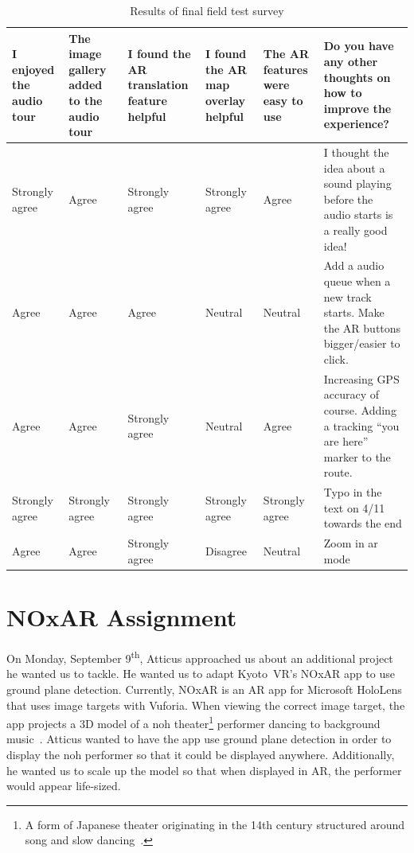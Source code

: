 \documentclass[a4paper, 10pt, american, titlepage]{article}
\begin{document}
\begin{table}[h]
\begin{singlespace}
\renewcommand{\arraystretch}{2.0} %
\footnotesize %
\begin{tabulary}{\textwidth}{ L | L | L | L | L | L }
	I enjoyed the audio tour & The image gallery added to the audio tour & I
	found the AR translation feature helpful & I found the AR map overlay
	helpful & The AR features were easy to use & Do you have any other thoughts
	on how to improve the experience? \\
	\hline

	Strongly agree & Agree & Strongly agree & Strongly agree & Agree & I thought
	the idea about a sound playing before the audio starts is a really good
	idea! \\

	Agree & Agree & Agree & Neutral & Neutral & Add a audio queue when a new
	track starts. Make the AR buttons bigger/easier to click. \\

	Agree & Agree & Strongly agree & Neutral & Agree & Increasing GPS accuracy
	of course. Adding a tracking ``you are here'' marker to the route. \\

	Strongly agree & Strongly agree & Strongly agree & Strongly agree & Strongly
	agree & Typo in the text on 4/11 towards the end \\

	Agree & Agree & Strongly agree & Disagree & Neutral & Zoom in ar mode \\
\end{tabulary}
\end{singlespace}
\caption{Results of final field test survey}
\label{tab:testingSurveyResults}
\end{table}

\clearpage

\section{NOxAR Assignment}
\label{sec:NOxAR}

On Monday, September 9\textsuperscript{th}, Atticus approached us about an
additional project he wanted us to tackle. He wanted us to adapt Kyoto~VR's
NOxAR app to use ground plane detection. Currently, NOxAR is an AR app for
Microsoft HoloLens that uses image targets with Vuforia. When viewing the
correct image target, the app projects a 3D model of a noh theater\footnote{A
form of Japanese theater originating in the 14th century structured around song
and slow dancing~\autocite{japanguide2018}.} performer dancing to background
music~\autocite{noxar2018}. Atticus wanted to have the app use ground plane
detection in order to display the noh performer so that it could be displayed
anywhere. Additionally, he wanted us to scale up the model so that when
displayed in AR, the performer would appear life-sized. 
\end{document}
